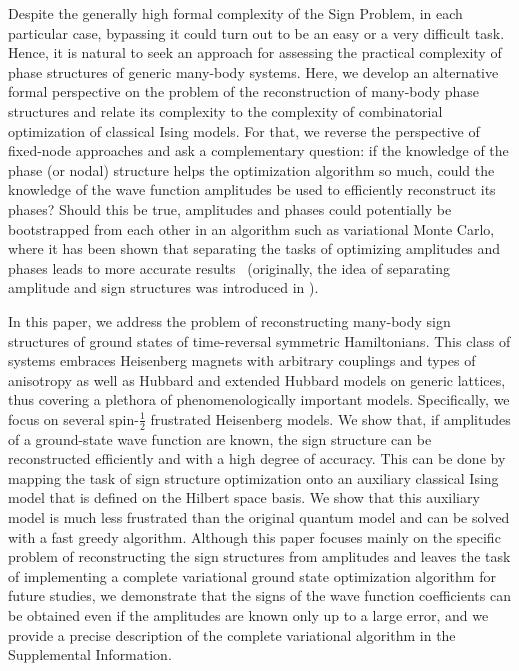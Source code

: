 Despite the generally high formal complexity of the Sign Problem, in each particular case, bypassing it could turn out to be an easy or a very difficult task. Hence, it is natural to seek an approach for assessing the practical complexity of phase structures of generic many-body systems. Here, we develop an alternative formal perspective on the problem of the reconstruction of many-body phase structures and relate its complexity to the complexity of combinatorial optimization of classical Ising models. For that, we reverse the perspective of fixed-node approaches and ask a complementary question: if the knowledge of the phase (or nodal) structure helps the optimization algorithm so much, could the knowledge of the wave function amplitudes be used to efficiently reconstruct its phases? Should this be true, amplitudes and phases could potentially be bootstrapped from each other in an algorithm such as variational Monte Carlo, where it has been shown that separating the tasks of optimizing amplitudes and phases leads to more accurate results~\cite{astrakhantsev2021} (originally, the idea of separating amplitude and sign structures was introduced in \cite{torlai2018neural}).

In this paper, we address the problem of reconstructing many-body sign structures of ground states of time-reversal symmetric Hamiltonians. This class of systems embraces Heisenberg magnets with arbitrary couplings and types of anisotropy as well as Hubbard and extended Hubbard models on generic lattices, thus covering a plethora of phenomenologically important models. Specifically, we focus on several spin-$\frac12$ frustrated Heisenberg models. We show that, if amplitudes of a ground-state wave function are known, the sign structure can be reconstructed efficiently and with a high degree of accuracy. This can be done by mapping the task of sign structure optimization onto an auxiliary classical Ising model that is defined on the Hilbert space basis. We show that this auxiliary model is much less frustrated than the original quantum model and can be solved with a fast greedy algorithm. Although this paper focuses mainly on the specific problem of reconstructing the sign structures from amplitudes and leaves the task of implementing a complete variational ground state optimization algorithm for future studies, we demonstrate that the signs of the wave function coefficients can be obtained even if the amplitudes are known only up to a large error, and we provide a precise description of the complete variational algorithm in the Supplemental Information.

